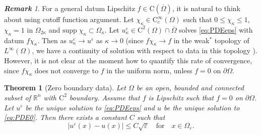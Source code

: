\documentclass[11pt,reqno]{amsart}
\numberwithin{figure}{section}
\theoremstyle{plain}
\newtheorem{thm}{Theorem}[section]
\theoremstyle{remark}
\newtheorem{rem}{\bf{Remark}}
\numberwithin{equation}{section}
\newcommand{\R}{\mathbb{R}}
\newcommand{\rmC}{\mathrm{C}}
\begin{document}
\begin{rem} For a general datum Lipschitz $f\in \mathrm{C}(\overline{\Omega})$, it is natural to think about using cutoff function argument. Let $\chi_{{\kappa}}\in \mathrm{C}_c^\infty(\Omega)$ such that $0\leq \chi_{\kappa}\leq 1$, $\chi_\kappa = 1$ in $\Omega_{2\kappa}$ and $\mathrm{supp}\;\chi_\kappa\subset\Omega_\kappa$. Let $u^\varepsilon_\kappa\in \rmC^2(\Omega)\cap\overline{\Omega}$ solves \eqref{eq:PDEeps} with datum $f\chi_{\kappa}$. Then as $u^\varepsilon_\kappa\to u^\varepsilon$ as $\kappa\to 0$ (since $f\chi_\kappa\to f$ in the weak$^*$ topology of $L^\infty(\Omega)$, we have a continuity of solution with respect to data in this topology \cite[Remark II.1]{Lasry1989}). However, it is not clear at the moment how to quantify this rate of convergence, since $f\chi_\kappa$ does not converge to $f$ in the uniform norm, unless $f = 0$ on $\partial\Omega$. 
\end{rem}
 




\begin{thm}[Zero boundary data]\label{thm:rate_doubling2} Let $\Omega$ be an open, bounded and connected subset of $\R^n$ with $\mathrm{C}^2$ boundary. Assume that $f$ is Lipschitz such that $f = 0$ on $\partial\Omega$. Let $u^\varepsilon$ be the unique solution to \eqref{eq:PDEeps} and $u$ be the unique solution to \eqref{eq:PDE0}. Then there exists a constant $C$ such that
\begin{equation*}
|u^\varepsilon(x) - u(x)| \leq C\sqrt{\varepsilon} \quad  \text{for} \quad x\in \Omega_{\varepsilon}.
\end{equation*}
\end{thm}
\end{document}
